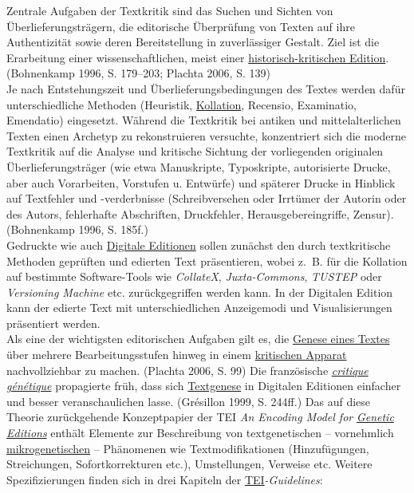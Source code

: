 \documentclass{article}
\begin{document}
    Zentrale Aufgaben der Textkritik sind das Suchen und Sichten von Überlieferungsträgern, die editorische Überprüfung von Texten auf ihre Authentizität sowie deren Bereitstellung in zuverlässiger Gestalt. Ziel ist die Erarbeitung einer wissenschaftlichen, meist einer \href{http://gams.uni-graz.at/o:konde.93}{historisch-kritischen Edition}. (Bohnenkamp 1996, S. 179–203; Plachta 2006, S. 139)\\
            
        Je nach Entstehungszeit und Überlieferungsbedingungen des Textes werden dafür unterschiedliche Methoden (Heuristik, \href{http://gams.uni-graz.at/o:konde.105}{Kollation}, Recensio, Examinatio, Emendatio) eingesetzt. Während die Textkritik bei antiken und mittelalterlichen Texten einen Archetyp zu rekonstruieren versuchte, konzentriert sich die moderne Textkritik auf die Analyse und kritische Sichtung der vorliegenden originalen Überlieferungsträger (wie etwa Manuskripte, Typoskripte, autorisierte Drucke, aber auch Vorarbeiten, Vorstufen u. Entwürfe) und späterer Drucke in Hinblick auf Textfehler und -verderbnisse (Schreibversehen oder Irrtümer der Autorin oder des Autors, fehlerhafte Abschriften, Druckfehler, Herausgebereingriffe, Zensur). (Bohnenkamp 1996, S. 185f.)\\
            
        Gedruckte wie auch \href{http://gams.uni-graz.at/o:konde.59}{Digitale Editionen} sollen zunächst den durch textkritische Methoden geprüften und edierten Text präsentieren, wobei z. B. für die Kollation auf bestimmte Software-Tools wie \emph{CollateX}, \emph{Juxta-Commons}, \emph{TUSTEP} oder \emph{Versioning Machine} etc. zurückgegriffen werden kann. In der Digitalen Edition kann der edierte Text mit unterschiedlichen Anzeigemodi und Visualisierungen präsentiert werden.\\
            
        Als eine der wichtigsten editorischen Aufgaben gilt es, die \href{http://gams.uni-graz.at/o:konde.28}{Genese eines Textes} über mehrere Bearbeitungsstufen hinweg in einem \href{http://gams.uni-graz.at/o:konde.32}{kritischen Apparat} nachvollziehbar zu machen. (Plachta 2006, S. 99) Die französische \emph{\href{http://gams.uni-graz.at/o:konde.46}{critique génétique}} propagierte früh, dass sich \href{http://gams.uni-graz.at/o:konde.28}{Textgenese} in Digitalen Editionen einfacher und besser veranschaulichen lasse. (Grésillon 1999, S. 244ff.) Das auf diese Theorie zurückgehende Konzeptpapier der TEI \emph{An Encoding Model for }\emph{\href{http://gams.uni-graz.at/o:konde.90}{Genetic Editions}} enthält Elemente zur Beschreibung von textgenetischen – vornehmlich \href{http://gams.uni-graz.at/o:konde.26}{mikrogenetischen} – Phänomenen wie Textmodifikationen (Hinzufügungen, Streichungen, Sofortkorrekturen etc.), Umstellungen, Verweise etc. Weitere Spezifizierungen finden sich in drei Kapiteln der \href{http://gams.uni-graz.at/o:konde.178}{TEI}\emph{-Guidelines}:\\
            
\end{document}
